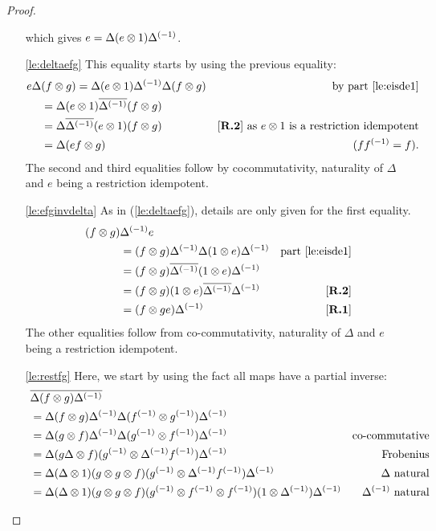 \begin{proof}
\begin{enumerate}[{(}i{)}]
      which gives $e = \Delta (e \otimes 1) {\Delta}^{(-1)}$.
    \item[\ref{le:deltaefg}]This equality starts by using the previous equality:
      \begin{align*}
        e\Delta &(f \* g) = \Delta (e\* 1) \inv{\Delta} \Delta(f \* g)
          &\text{by part \ref{le:eisde1}}\\
        &=\Delta(e  \* 1) \rst{\inv{\Delta}}(f\*g)&\\
        &=\Delta\rst{\inv{\Delta}}(e \*1)(f\*g)
          & \text{\rtwo as $e\*1$ is a restriction idempotent}\\
        &=\Delta (e f \* g) &\text{ ($f\inv{f} = f$)}.
      \end{align*}
      The second and third equalities follow by cocommutativity, naturality of $\Delta$ and $e$
      being a restriction idempotent.
    \item[\ref{le:efginvdelta}] As in (\vref{le:deltaefg}), details are only given for the
      first equality.
      \begin{align*}
        (f \otimes g)&{\Delta}^{(-1)} e \\
        &= (f \otimes g) {\Delta}^{(-1)}\Delta (1\otimes e) {\Delta}^{(-1)}   &\text{part \ref{le:eisde1}}\\
        &=(f\otimes g)\overline{{\Delta}^{(-1)}}(1\otimes e) {\Delta}^{(-1)}&\\
        &=(f\otimes g)(1\otimes e) \overline{{\Delta}^{(-1)}}{\Delta}^{(-1)}&[\text{\bfseries {R}.{2}}]\\
        &=(f\otimes g e){\Delta}^{(-1)}&[\text{\bfseries {R}.{1}}]
      \end{align*}
      The other equalities follow from co-commutativity, naturality of $\Delta$ and $e$ being
      a restriction idempotent.
    \item[\ref{le:restfg}]Here, we start by using the fact all maps have a partial inverse:
      \begin{align*}
        ~&\restr{\Delta (f \* g) \inv{\Delta} } \\
        &=\Delta (f \* g) \inv{\Delta} \Delta (\inv{f} \* \inv{g}) \inv{\Delta} \\
        &=\Delta (g \* f) \inv{\Delta} \Delta (\inv{g} \* \inv{f}) \inv{\Delta}& \text{co-commutative} \\
        &=\Delta(g\Delta \*f)(\inv{g}\*\inv{\Delta}\inv{f})\inv{\Delta}&\text{Frobenius}\\
        &=\Delta (\Delta\*1)(g \* g \* f)(\inv{g}\*\inv{\Delta}\inv{f})\inv{\Delta}&\Delta \text{ natural}\\
        &=\Delta (\Delta\*1)(g \* g \* f)(\inv{g} \* \inv{f}\* \inv{f})(1\* \inv{\Delta})\inv{\Delta}&\inv{\Delta} \text{ natural}\\

\end{align*}
\end{enumerate}
\end{proof}
